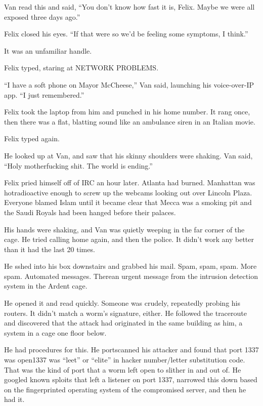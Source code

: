 Van read this and said, “You don’t know how fast it is, Felix.
Maybe we were all exposed three days ago.”

Felix closed his eyes. “If that were so we’d be feeling some
symptoms, I think.”


It was an unfamiliar handle.

Felix typed, staring at NETWORK PROBLEMS.

“I have a soft phone on Mayor McCheese,” Van said, launching his
voice-over-IP app. “I just remembered.”

Felix took the laptop from him and punched in his home number. It
rang once, then there was a flat, blatting sound like an ambulance
siren in an Italian movie.

Felix typed again.

He looked up at Van, and saw that his skinny shoulders were
shaking. Van said, “Holy motherfucking shit. The world is ending.”

\tb

Felix pried himself off of IRC an hour later. Atlanta had burned.
Manhattan was hot\dash{}radioactive enough to screw up the webcams
looking out over Lincoln Plaza. Everyone blamed Islam until it
became clear that Mecca was a smoking pit and the Saudi Royals had
been hanged before their palaces.

His hands were shaking, and Van was quietly weeping in the far
corner of the cage. He tried calling home again, and then the
police. It didn’t work any better than it had the last 20 times.

He sshed into his box downstairs and grabbed his mail. Spam, spam,
spam. More spam. Automated messages. There\dash{}an urgent message from
the intrusion detection system in the Ardent cage.

He opened it and read quickly. Someone was crudely, repeatedly
probing his routers. It didn’t match a worm’s signature, either. He
followed the traceroute and discovered that the attack had
originated in the same building as him, a system in a cage one
floor below.

He had procedures for this. He portscanned his attacker and found
that port 1337 was open\dash{}1337 was “leet” or “elite” in hacker
number/letter substitution code. That was the kind of port that a
worm left open to slither in and out of. He googled known sploits
that left a listener on port 1337, narrowed this down based on the
fingerprinted operating system of the compromised server, and then
he had it.

